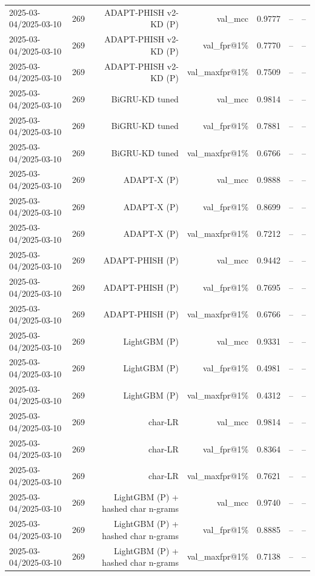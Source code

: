 \begin{table}[t]
\begin{tabular}{llrrrrr}
2025-03-04/2025-03-10 & 269 & ADAPT-PHISH v2-KD (P) & val\_mcc & 0.9777 & -- & -- \\
2025-03-04/2025-03-10 & 269 & ADAPT-PHISH v2-KD (P) & val\_fpr@1\% & 0.7770 & -- & -- \\
2025-03-04/2025-03-10 & 269 & ADAPT-PHISH v2-KD (P) & val\_maxfpr@1\% & 0.7509 & -- & -- \\
2025-03-04/2025-03-10 & 269 & BiGRU-KD tuned & val\_mcc & 0.9814 & -- & -- \\
2025-03-04/2025-03-10 & 269 & BiGRU-KD tuned & val\_fpr@1\% & 0.7881 & -- & -- \\
2025-03-04/2025-03-10 & 269 & BiGRU-KD tuned & val\_maxfpr@1\% & 0.6766 & -- & -- \\
2025-03-04/2025-03-10 & 269 & ADAPT-X (P) & val\_mcc & 0.9888 & -- & -- \\
2025-03-04/2025-03-10 & 269 & ADAPT-X (P) & val\_fpr@1\% & 0.8699 & -- & -- \\
2025-03-04/2025-03-10 & 269 & ADAPT-X (P) & val\_maxfpr@1\% & 0.7212 & -- & -- \\
2025-03-04/2025-03-10 & 269 & ADAPT-PHISH (P) & val\_mcc & 0.9442 & -- & -- \\
2025-03-04/2025-03-10 & 269 & ADAPT-PHISH (P) & val\_fpr@1\% & 0.7695 & -- & -- \\
2025-03-04/2025-03-10 & 269 & ADAPT-PHISH (P) & val\_maxfpr@1\% & 0.6766 & -- & -- \\
2025-03-04/2025-03-10 & 269 & LightGBM (P) & val\_mcc & 0.9331 & -- & -- \\
2025-03-04/2025-03-10 & 269 & LightGBM (P) & val\_fpr@1\% & 0.4981 & -- & -- \\
2025-03-04/2025-03-10 & 269 & LightGBM (P) & val\_maxfpr@1\% & 0.4312 & -- & -- \\
2025-03-04/2025-03-10 & 269 & char-LR & val\_mcc & 0.9814 & -- & -- \\
2025-03-04/2025-03-10 & 269 & char-LR & val\_fpr@1\% & 0.8364 & -- & -- \\
2025-03-04/2025-03-10 & 269 & char-LR & val\_maxfpr@1\% & 0.7621 & -- & -- \\
2025-03-04/2025-03-10 & 269 & LightGBM (P) + hashed char n-grams & val\_mcc & 0.9740 & -- & -- \\
2025-03-04/2025-03-10 & 269 & LightGBM (P) + hashed char n-grams & val\_fpr@1\% & 0.8885 & -- & -- \\
2025-03-04/2025-03-10 & 269 & LightGBM (P) + hashed char n-grams & val\_maxfpr@1\% & 0.7138 & -- & -- \\

\end{tabular}
\end{table}
